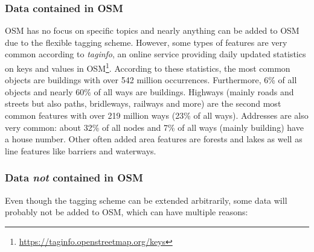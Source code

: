 		\subsubsection{Data contained in OSM}
		
			OSM has no focus on specific topics and nearly anything can be added to OSM due to the flexible tagging scheme.
			However, some types of features are very common according to \emph{taginfo}, an online service providing daily updated statistics on keys and values in OSM\footnote{\url{https://taginfo.openstreetmap.org/keys}}.
			According to these statistics, the most common objects are buildings with over 542 million occurrences.
			Furthermore, 6\% of all objects and nearly 60\% of all ways are buildings.
			Highways (mainly roads and streets but also paths, bridleways, railways and more) are the second most common features with over 219 million ways (23\% of all ways).
			Addresses are also very common: about 32\% of all nodes and 7\% of all ways (mainly building) have a house number.
			Other often added area features are forests and lakes as well as line features like barriers and waterways.
			
		\subsubsection{Data \textit{not} contained in OSM}
		\label{subsubsec:data-not-in-osm}
		
			Even though the tagging scheme can be extended arbitrarily, some data will probably not be added to OSM, which can have multiple reasons:
			
